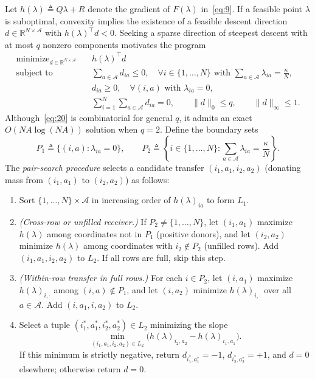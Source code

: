 \documentclass[11pt,letterpaper]{article}
\newcommand{\R}{\mathbb{R}}
\newcommand{\norm}[1]{\lVert #1\rVert}
\newcommand{\defeq}{\triangleq}
\theoremstyle{definition}
\begin{document}
Let $h(\lambda) \defeq Q\lambda + R$ denote the gradient of $F(\lambda)$ in~\eqref{eq:9}. If a feasible point $\lambda$ is suboptimal, convexity implies the existence of a feasible descent direction $d\in\R^{N\times\mathcal{A}}$ with $h(\lambda)^\top d < 0$. Seeking a sparse direction of steepest descent with at most $q$ nonzero components motivates the program
\begin{equation}
\begin{aligned}
 \text{minimize}_{d\in\R^{N\times\mathcal{A}}}\quad & h(\lambda)^\top d \\
 \text{subject to}\quad &
   \sum_{a\in\mathcal{A}} d_{ia} \le 0, \quad \forall i\in\{1,\ldots,N\} \text{ with } \sum_{a\in\mathcal{A}} \lambda_{ia} = \frac{\kappa}{N}, \\
 & d_{ia} \ge 0, \quad \forall (i,a) \text{ with } \lambda_{ia} = 0, \\
 & \sum_{i=1}^N \sum_{a\in\mathcal{A}} d_{ia} = 0, \qquad \norm{d}_0 \le q, \qquad \norm{d}_\infty \le 1.
\end{aligned}
\tag{20}\label{eq:20}
\end{equation}
Although~\eqref{eq:20} is combinatorial for general $q$, it admits an exact $O(NA\log(NA))$ solution when $q = 2$. Define the boundary sets
\[
 P_1 \defeq \bigl\{(i,a) : \lambda_{ia} = 0\bigr\}, \qquad
 P_2 \defeq \left\{i\in\{1,\ldots,N\} : \sum_{a\in\mathcal{A}} \lambda_{ia} = \frac{\kappa}{N}\right\}.
\]
The \emph{pair-search procedure} selects a candidate transfer $(i_1,a_1,i_2,a_2)$ (donating mass from $(i_1,a_1)$ to $(i_2,a_2)$) as follows:
\begin{enumerate}[leftmargin=2em,itemsep=2pt]
  \item Sort $\{1,\ldots,N\}\times\mathcal{A}$ in increasing order of $h(\lambda)_{ia}$ to form $L_1$.
  \item \emph{(Cross-row or unfilled receiver.)} If $P_2 \ne \{1,\ldots,N\}$, let $(i_1,a_1)$ maximize $h(\lambda)$ among coordinates not in $P_1$ (positive donors), and let $(i_2,a_2)$ minimize $h(\lambda)$ among coordinates with $i_2\notin P_2$ (unfilled rows). Add $(i_1,a_1,i_2,a_2)$ to $L_2$. If all rows are full, skip this step.
  \item \emph{(Within-row transfer in full rows.)} For each $i \in P_2$, let $(i,a_1)$ maximize $h(\lambda)_{i,\cdot}$ among $(i,a)\notin P_1$, and let $(i,a_2)$ minimize $h(\lambda)_{i,\cdot}$ over all $a\in\mathcal{A}$. Add $(i,a_1,i,a_2)$ to $L_2$.
  \item Select a tuple $(i_1^*,a_1^*,i_2^*,a_2^*) \in L_2$ minimizing the slope
  \begin{equation}
   \min_{(i_1,a_1,i_2,a_2)\in L_2} \bigl(h(\lambda)_{i_2,a_2} - h(\lambda)_{i_1,a_1}\bigr).
   \tag{21}\label{eq:21}
  \end{equation}
  If this minimum is strictly negative, return $d_{i_1^*,a_1^*} = -1$, $d_{i_2^*,a_2^*} = +1$, and $d = 0$ elsewhere; otherwise return $d = 0$.
\end{enumerate}
\end{document}
